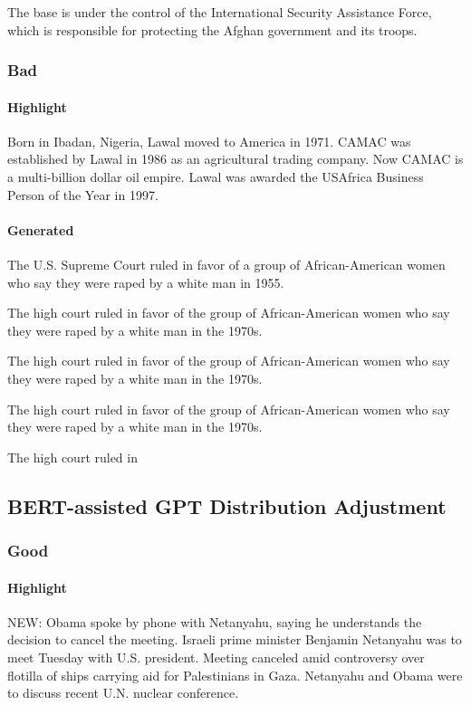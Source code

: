 \documentclass{article}
\begin{document}
The base is under the control of the International Security Assistance Force, which is responsible for protecting the Afghan government and its troops.

\subsubsection{Bad}

\paragraph{Highlight} 
Born in Ibadan, Nigeria, Lawal moved to America in 1971. CAMAC was established by Lawal in 1986 as an agricultural trading company. Now CAMAC is a multi-billion dollar oil empire. Lawal was awarded the USAfrica Business Person of the Year in 1997.

\paragraph{Generated} 


The U.S. Supreme Court ruled in favor of a group of African-American women who say they were raped by a white man in 1955.

The high court ruled in favor of the group of African-American women who say they were raped by a white man in the 1970s.

The high court ruled in favor of the group of African-American women who say they were raped by a white man in the 1970s.

The high court ruled in favor of the group of African-American women who say they were raped by a white man in the 1970s.

The high court ruled in

\subsection{BERT-assisted GPT Distribution Adjustment}
\label{dau-wo}

\subsubsection{Good}

\paragraph{Highlight} 
NEW: Obama spoke by phone with Netanyahu, saying he understands the decision to cancel the meeting. Israeli prime minister Benjamin Netanyahu was to meet Tuesday with U.S. president. Meeting canceled amid controversy over flotilla of ships carrying aid for Palestinians in Gaza. Netanyahu and Obama were to discuss recent U.N. nuclear conference.
\end{document}
